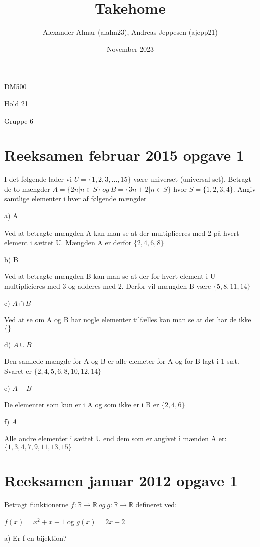\documentclass{article}
\title{Takehome}
\author{Alexander Almar (alalm23), Andreas Jeppesen (ajepp21)}
\date{November 2023}
\begin{document}
\maketitle

{\centering 
DM500 \par
Hold 21 \par
Gruppe 6 \par
}


\section{Reeksamen februar 2015 opgave 1}
I det følgende lader vi \(U = \{1, 2, 3, . . . , 15\}\) være universet (universal set). Betragt de to mængder 
\(A = \{2n | n \in S\}\ og\ B = \{3n + 2 | n \in S\}\) hvor \(S = \{1, 2, 3, 4\}\). Angiv samtlige elementer i hver af følgende mængder

a) A

Ved at betragte mængden A kan man se at der multipliceres med 2 på hvert element i sættet U. Mængden A er derfor
\(\{2,4,6,8\}\)

b) B

Ved at betragte mængden B kan man se at der for hvert element i U multiplicieres med 3 og adderes med 2. Derfor vil mængden B være 
\(\{5,8,11,14\}\)

c) \(A \cap B\)

Ved at se om A og B har nogle elementer tilfælles kan man se at det har de ikke 
\(\{\}\)

d) \(A \cup B\)

Den samlede mængde for A og B er alle elemeter for A og for B lagt i 1 sæt. Svaret er 
\(\{2,4,5,6,8,10,12,14\}\)

e) \(A-B\)

De elementer som kun er i A og som ikke er i B er
\(\{2,4,6\}\)

f) \(\bar A \)

Alle andre elementer i sættet U end dem som er angivet i mænden A er:
\(\{1,3,4,7,9,11,13,15\}\)

\section{Reeksamen januar 2012 opgave 1}
Betragt funktionerne \(f : \mathbb{R} \rightarrow \mathbb{R}\ og\ g : \mathbb{R} \rightarrow \mathbb{R}\) defineret ved:

$f (x) = x^2 + x + 1 $ og
$g(x) = 2x - 2$


a) Er f en bijektion?
\end{document}
